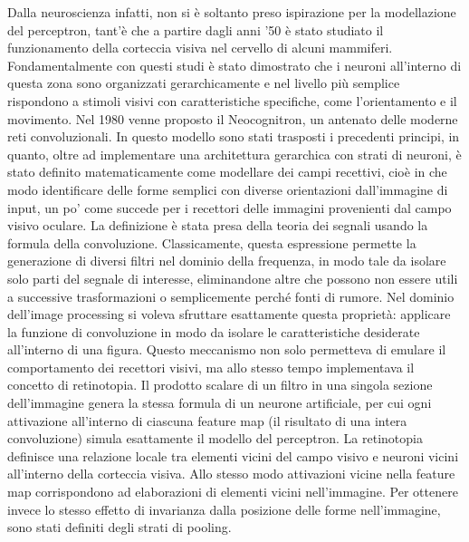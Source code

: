 Dalla neuroscienza infatti, non si è soltanto preso ispirazione per la modellazione del perceptron, tant'è che a partire dagli anni '50 è stato studiato il funzionamento della corteccia visiva nel cervello di alcuni mammiferi. Fondamentalmente con questi studi è stato dimostrato che i neuroni all'interno di questa zona sono organizzati gerarchicamente e nel livello più semplice rispondono a stimoli visivi con caratteristiche specifiche, come l'orientamento e il movimento. Nel 1980 venne proposto il Neocognitron, un antenato delle moderne reti convoluzionali. In questo modello sono stati trasposti i precedenti principi, in quanto, oltre ad implementare una architettura gerarchica con strati di neuroni, è stato definito matematicamente come modellare dei campi recettivi, cioè in che modo identificare delle forme semplici con diverse orientazioni dall'immagine di input, un po' come succede per i recettori delle immagini provenienti dal campo visivo oculare. La definizione è stata presa della teoria dei segnali usando la formula della convoluzione. Classicamente, questa espressione permette la generazione di diversi filtri nel dominio della frequenza, in modo tale da isolare solo parti del segnale di interesse, eliminandone altre che possono non essere utili a successive trasformazioni o semplicemente perché fonti di rumore. Nel dominio dell'image processing si voleva sfruttare esattamente questa proprietà: applicare la funzione di convoluzione in modo da isolare le caratteristiche desiderate all'interno di una figura. Questo meccanismo non solo permetteva di emulare il comportamento dei recettori visivi, ma allo stesso tempo implementava il concetto di retinotopia. Il prodotto scalare di un filtro in una singola sezione dell'immagine genera la stessa formula di un neurone artificiale, per cui ogni attivazione all'interno di ciascuna feature map (il risultato di una intera convoluzione) simula esattamente il modello del perceptron. La retinotopia definisce una relazione locale tra elementi vicini del campo visivo e neuroni vicini all'interno della corteccia visiva. Allo stesso modo attivazioni vicine nella feature map corrispondono ad elaborazioni di elementi vicini nell'immagine. Per ottenere invece lo stesso effetto di invarianza dalla posizione delle forme nell'immagine, sono stati definiti degli strati di pooling. 

